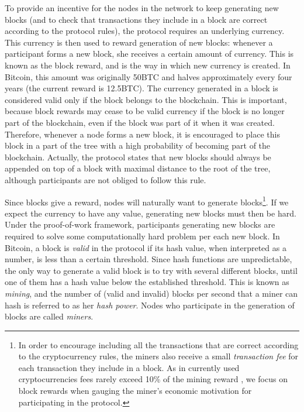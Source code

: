 To provide an incentive for the nodes in the network to keep  generating new blocks (and to check that transactions they include in a block are correct according to the protocol rules), the protocol requires an underlying currency. This currency is then used to reward generation of new blocks: whenever a participant forms a new block, she receives a certain amount of currency. This is known as the block reward, and is the way in which new currency is created. In Bitcoin, this amount was originally 50BTC and halves approximately every four years (the current reward is 12.5BTC). The currency generated in a block is considered valid only if the block belongs to the blockchain. This is important, because block rewards may cease to be valid currency if the block is no longer part of the blockchain, even if the block was part of it when it was created. Therefore, whenever a node forms a new block, it is encouraged to place this block in a part of the tree with a high probability of becoming part of the blockchain. Actually, the protocol states that new blocks should always be appended on top of a block with maximal distance to the root of the tree, although participants are not obliged to follow this rule.

Since blocks give a reward, nodes will naturally want to generate blocks\footnote{In order to encourage including all the transactions that are correct according to the cryptocurrency rules, the miners also receive a small {\em transaction fee} for each transaction they include in a block. As in currently used cryptocurrencies fees rarely exceed 10\% of the mining reward \cite{TotalMiningRevenue,TotalMiningFees}, we focus on block rewards when gauging the miner's economic motivation for participating in the protocol.}. If we expect the currency to have any value, generating new blocks must then be hard. Under the proof-of-work framework, participants generating new blocks are required to solve some computationally hard problem per each new block. In Bitcoin, a block is \emph{valid} in the protocol if its hash value, when interpreted as a number, is less than a certain threshold. Since hash functions are unpredictable, the only way to generate a valid block is to try with several different blocks, until one of them has a hash value below the established threshold. This is known as \emph{mining}, and the number of (valid and invalid) blocks per second that a miner can hash is referred to as her \emph{hash power}. Nodes who participate in the generation of blocks are called \emph{miners}. 

